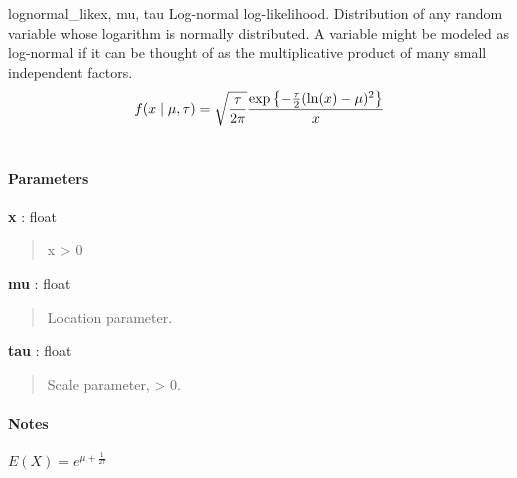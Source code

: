 \hypertarget{pymc.distributions.lognormal_like}{}
\begin{funcdesc}{lognormal\_like}{x, mu, tau}
Log-normal log-likelihood. Distribution of any random variable whose
logarithm is normally distributed. A variable might be modeled as
log-normal if it can be thought of as the multiplicative product of many
small independent factors.
\begin{gather}
\begin{split}f(x \mid \mu, \tau) = \sqrt{\frac{\tau}{2\pi}}\frac{
\exp\left\{ -\frac{\tau}{2} (\ln(x)-\mu)^2 \right\}}{x}\end{split}\notag\\\begin{split}\end{split}\notag
\end{gather}\paragraph{Parameters}\begin{paramlist}

\item[] \textbf{x} : float
\begin{quote}

x \textgreater{} 0
\end{quote}

\item[] \textbf{mu} : float
\begin{quote}

Location parameter.
\end{quote}

\item[] \textbf{tau} : float
\begin{quote}

Scale parameter, \textgreater{} 0.
\end{quote}
\end{paramlist}
\paragraph{Notes}

$E(X)=e^{\mu+\frac{1}{2\tau}}$
\end{funcdesc}

